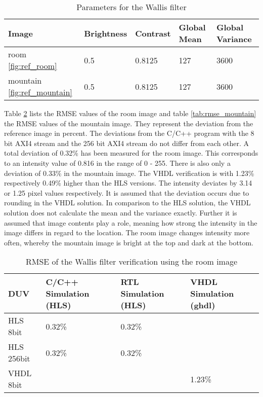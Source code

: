 \begin{table}[tb!]
    \centering
    \begin{tabular}{l l l l l}
        \toprule
        Image & Brightness & Contrast & Global Mean & Global Variance \\
        \midrule
        room \ref{fig:ref_room} & 0.5 & 0.8125 & 127 & 3600 \\
        mountain \ref{fig:ref_mountain} & 0.5 & 0.8125 & 127 & 3600 \\
        \bottomrule
    \end{tabular}
    \caption{Parameters for the Wallis filter}
    \label{tab:parameter}
\end{table}



Table \ref{tab:rmse_room} lists the RMSE values of the room image and table 
\ref{tab:rmse_mountain} the RMSE
values of the mountain image. They
represent the deviation from the reference image in percent. The deviations from
the C/C++ program with the 8 bit AXI4 stream and the 256 bit AXI4 stream do
not differ from each other. A total deviation of 0.32\% has been measured for
the
room image. This corresponds to an intensity value of 0.816 in the range of 0 -
255. There is also only a deviation of 0.33\% in the mountain image. The VHDL
verification is with 1.23\% respectively 0.49\% higher than the
HLS versions. The intensity deviates by 3.14 or 1.25 pixel values respectively.
It is assumed that the deviation occurs due to rounding in the VHDL solution. In
comparison to the HLS solution, the VHDL solution does not calculate the mean
and the variance exactly. Further it is assumed that image contents play a
role, meaning how strong the intensity in the image differs in regard to the
location. The room image changes intensity more often, whereby the mountain
image is bright at the top and dark at the bottom.

\begin{table}[tb!]
    \centering
    \begin{tabular}{l l l l}
        \toprule
        DUV & C/C++ Simulation (HLS) & RTL Simulation (HLS) & VHDL Simulation (ghdl) \\
        \midrule
        HLS  8bit    & 0.32\%    & 0.32\%    & {}\\
        HLS  256bit  & 0.32\%    & 0.32\%    & {} \\
        VHDL 8bit        & {}         & {}         & 1.23\% \\
        \bottomrule
    \end{tabular}
    \caption{RMSE of the Wallis filter verification using the room image}
    \label{tab:rmse_room}
\end{table}

